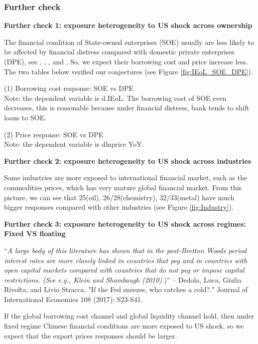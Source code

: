 \documentclass[12pt]{article}
\begin{document}
\subsubsection{Further check}
 
\textbf{Further check 1: exposure heterogeneity to US shock across ownership}

The financial condition of State-owned enterprises (SOE) usually are less likely to be affected by financial distress compared with domestic private enterprises (DPE), see \cite{boyreau2005pitfalls}, \cite{dollar2007wasted}, \cite{riedel2007overview}, and \cite{song2011growing}. So, we expect their borrowing cost and price increase less.  The two tables below verified our conjectures (see Figure \ref{fig:IEoL_SOE_DPE}).

(1) Borrowing cost response: SOE vs DPE \\
Note: the dependent variable is d.IEoL. The borrowing cost of SOE even decreases, this is reasonable because under financial distress, bank tends to shift loans to SOE.



(2) Price response: SOE vs DPE \\
Note: the dependent variable is dlnprice YoY.


\textbf{Further check 2: exposure heterogeneity to US shock across industries}

Some industries are more exposed to international financial market, such as the commodities prices, which has very mature global financial market. From this picture, we can see that 25(oil), 26/28(chemistry), 32/33(metal) have much bigger responses compared with other industries (see Figure \ref{fig:Industry}).




\textbf{Further check 3: exposure heterogeneity to US shock across regimes: Fixed VS floating}

“\textit{A large body of this literature has shown that in the post-Bretton Woods period interest rates are more closely linked in countries that peg and in countries with open capital markets compared with countries that do not peg or impose capital restrictions. (See e.g., Klein and Shambaugh (2010).})” -- Dedola, Luca, Giulia Rivolta, and Livio Stracca. "If the Fed sneezes, who catches a cold?." Journal of International Economics 108 (2017): S23-S41.


If the global borrowing cost channel and global liquidity channel hold, then under fixed regime Chinese financial conditions are more exposed to US shock, so we expect that the export prices responses should be larger.
\end{document}
